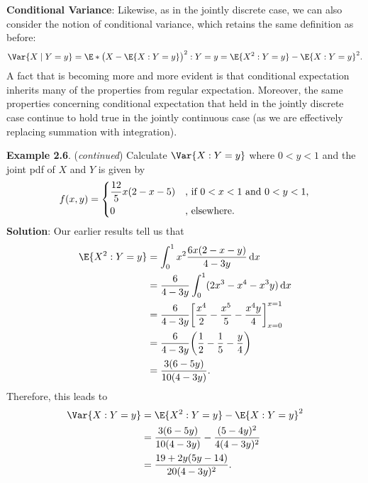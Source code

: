 \begin{Regular}{}
    \textbf{Conditional Variance}: Likewise, as in the jointly discrete case, we can also consider the notion of
    conditional variance, which retains the same definition as before:
    \[ \Var{X\mid Y=y}=\E*{\bigl(X-\E{X\given Y=y}\bigr)^2\given Y=y}=\E{X^2\given Y=y}-\E{X\given Y=y}^2. \]
    A fact that is becoming more and more evident is that conditional expectation inherits many
    of the properties from regular expectation. Moreover, the same properties concerning
    conditional expectation that held in the jointly discrete case continue to hold true in the
    jointly continuous case (as we are effectively replacing summation with integration).
\end{Regular}
\begin{Example}{}
    \textbf{Example 2.6}. (\emph{continued}) Calculate $ \Var{X\given Y=y} $ where $ 0<y<1 $ and the joint pdf of
    $ X $ and $ Y $ is given by
    \[ f(x,y)=\begin{dcases}
            \frac{12}{5}x(2-x-5) & \text{, if $ 0<x<1 $ and $ 0<y<1 $,} \\
            0                    & \text{, elsewhere}.
        \end{dcases} \]
    \tcblower{}
    \textbf{Solution}: Our earlier results tell us that
    \begin{align*}
        \E{X^2\given Y=y}
         & =\int_{0}^{1}x^2 \frac{6x(2-x-y)}{4-3y} \odif{x}                                         \\
         & =\frac{6}{4-3y} \int_{0}^{1}(2x^3-x^4-x^3y)\odif{x}                                      \\
         & =\frac{6}{4-3y} \biggl[\frac{x^4}{2} -\frac{x^5}{5} -\frac{x^4 y}{4} \biggr]_{x=0}^{x=1} \\
         & =\frac{6}{4-3y} \biggl(\frac{1}{2} -\frac{1}{5} -\frac{y}{4} \biggr)                     \\
         & =\frac{3(6-5y)}{10(4-3y)}.
    \end{align*}
    Therefore, this leads to
    \begin{align*}
        \Var{X\given Y=y}
         & =\E{X^2\given Y=y}-\E{X\given Y=y}^2                  \\
         & =\frac{3(6-5y)}{10(4-3y)} -\frac{(5-4y)^2}{4(4-3y)^2} \\
         & =\frac{19+2y(5y-14)}{20(4-3y)^2}.
    \end{align*}
\end{Example}
